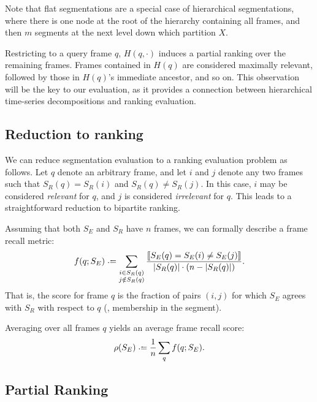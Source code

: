 \documentclass{article}
\begin{document}
Note that flat segmentations are a special case of hierarchical segmentations, where there is one node at the root of the hierarchy containing all frames, and then $m$ segments at the next level down which partition $X$.

Restricting to a query frame $q$, $H(q, \cdot)$ induces a partial ranking over the
remaining frames.  Frames contained in $H(q)$ are considered maximally relevant,
followed by those in $H(q)$'s immediate ancestor, and so on.
This observation will be the key to our evaluation, as it provides a connection
between hierarchical time-series decompositions and ranking evaluation.


\subsection{Reduction to ranking}


We can reduce segmentation evaluation to a ranking evaluation problem as follows.
Let $q$ denote an arbitrary frame, and let $i$ and $j$ denote any two frames such that $S_R(q) = S_R(i)$ and $S_R(q) \neq S_R(j)$.
In this case, $i$ may be considered \emph{relevant} for $q$, and $j$ is considered \emph{irrelevant} for $q$.
This leads to a straightforward reduction to bipartite ranking.

Assuming that both $S_E$ and $S_R$ have $n$ frames, we can formally describe a frame
recall metric:
\begin{equation}
f(q ; S_E) \defeq 
\sum_{\substack{i \in S_R(q)\\ j \notin S_R(q)}}
\frac{\ind{S_E(q) = S_E(i) \neq S_E(j) }}{|S_R(q)|\cdot (n -
|S_R(q)|)}.\label{flatrecall}
\end{equation}
That is, the score for frame $q$ is the fraction of pairs $(i, j)$ for which $S_E$
agrees with $S_R$ with respect to $q$ (\ie, membership in the segment).

Averaging over all frames $q$ yields an average frame recall score:
\begin{equation}
\rho(S_E) \defeq \frac{1}{n} \sum_q f(q ; S_E).\label{avgrecall}
\end{equation}
\nocite{levy2008structural}


\subsection{Partial Ranking}
\end{document}

